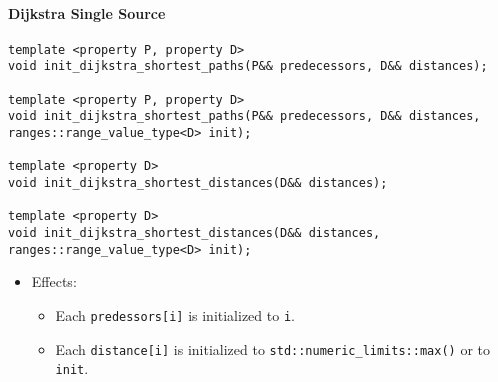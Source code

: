 \paragraph{Dijkstra Single Source}

\begin{lstlisting}
template <property P, property D>
void init_dijkstra_shortest_paths(P&& predecessors, D&& distances);

template <property P, property D>
void init_dijkstra_shortest_paths(P&& predecessors, D&& distances, ranges::range_value_type<D> init);

template <property D>
void init_dijkstra_shortest_distances(D&& distances);

template <property D>
void init_dijkstra_shortest_distances(D&& distances, ranges::range_value_type<D> init);

\end{lstlisting}

\begin{itemize}
\item[] 
Effects:
\begin{itemize}
\item[]
  Each \lstinline{predessors[i]} is initialized to \lstinline{i}.
\item[] Each 
\lstinline{distance[i]} is initialized to \lstinline{std::numeric_limits::max()}
or to \lstinline{init}.
\end{itemize}
\end{itemize}


